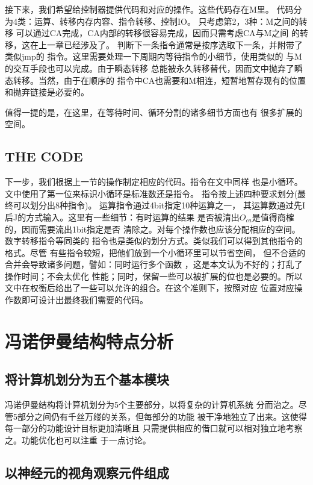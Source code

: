 \documentclass[UTF8]{ctexart}
\begin{document}
接下来，我们希望给控制器提供代码和对应的操作。这些代码存在M里。
代码分为4类：运算、转移内存内容、指令转移、控制IO。
只考虑第2，3种：M之间的转移
可以通过CA完成，CA内部的转移很容易完成，因而只需考虑CA与M之间
的转移，这在上一章已经涉及了。
判断下一条指令通常是按序选取下一条，并附带了类似jmp的
指令。这里需要处理一下周期内等待指令的小细节，使用类似的
与M的交互手段也可以完成。由于瞬态转移
总能被永久转移替代，因而文中抛弃了瞬态转移。当然，由于在顺序的
指令中CA也需要和M相连，短暂地暂存现有的位置和抛弃链接是必要的。

值得一提的是，在这里，在等待时间、循环分割的诸多细节方面也有
很多扩展的空间。

\subsection{THE CODE}

下一步，我们根据上一节的操作制定相应的代码。指令在文中同样
也是小循环。文中使用了第一位来标识小循环是标准数还是指令。
指令按上述四种要求划分(最终可以划分出8种指令)。
运算指令通过4bit指定10种运算之一，
其运算数通过先I后J的方式输入。这里有一些细节：有时运算的结果
是否被清出$O_{ca}$是值得商榷的，因而需要流出1bit指定是否
清除之。对每个操作数也应该分配相应的空间。数字转移指令等同类的
指令也是类似的划分方式。类似我们可以得到其他指令的格式。尽管
有些指令较短，把他们放到一个小循环里可以节省空间，
但不合适的合并会导致诸多问题，譬如：同时运行多个函数
，这是本文认为不好的；打乱了操作时间；不会太优化
性能；同时，保留一些可以被扩展的位也是必要的。所以
文中在权衡后给出了一些可以允许的组合。在这个准则下，按照对应
位置对应操作数即可设计出最终我们需要的代码。

\section{冯诺伊曼结构特点分析}

\subsection{将计算机划分为五个基本模块}

冯诺伊曼结构将计算机划分为5个主要部分，以将复杂的计算机系统
分而治之。尽管5部分之间仍有千丝万缕的关系，但每部分的功能
被干净地独立了出来。这使得每一部分的功能设计目标更加清晰且
只需提供相应的借口就可以相对独立地考察之。功能优化也可以注重
于一点讨论。

\subsection{以神经元的视角观察元件组成}
\end{document}
